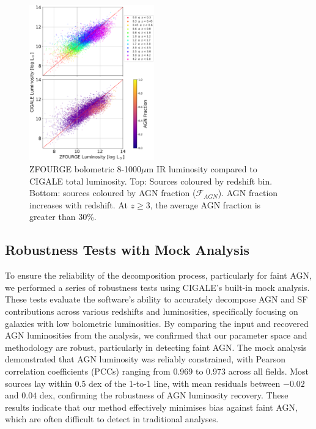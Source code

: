 \begin{figure}
    \centering
    \includegraphics[width=0.48\textwidth]{Figures/LIR vs LIR.png}
    \caption{ZFOURGE bolometric 8-1000$\mu$m IR luminosity compared to CIGALE total luminosity. Top: Sources coloured by redshift bin. Bottom: sources coloured by AGN fraction ($\mathcal{F}_{AGN}$). AGN fraction increases with redshift. At $z \geq 3$, the average AGN fraction is greater than 30\%.}
    \label{Fig: LIR vs LIR}
\end{figure}

\subsection{Robustness Tests with Mock Analysis} \label{Sec: Mock_Analysis}
To ensure the reliability of the decomposition process, particularly for faint AGN, we performed a series of robustness tests using CIGALE's built-in mock analysis. These tests evaluate the software's ability to accurately decompose AGN and SF contributions across various redshifts and luminosities, specifically focusing on galaxies with low bolometric luminosities. By comparing the input and recovered AGN luminosities from the analysis, we confirmed that our parameter space and methodology are robust, particularly in detecting faint AGN. The mock analysis demonstrated that AGN luminosity was reliably constrained, with Pearson correlation coefficients (PCCs) ranging from 0.969 to 0.973 across all fields. Most sources lay within 0.5 dex of the 1-to-1 line, with mean residuals between $-0.02$ and $0.04$ dex, confirming the robustness of AGN luminosity recovery. These results indicate that our method effectively minimises bias against faint AGN, which are often difficult to detect in traditional analyses.

